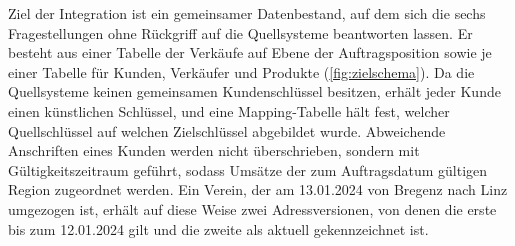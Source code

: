 \documentclass[a4paper,12pt]{article}
\begin{document}
Ziel der Integration ist ein gemeinsamer Datenbestand, auf dem sich die sechs Fragestellungen ohne Rückgriff auf die Quellsysteme beantworten lassen. Er besteht aus einer Tabelle der Verkäufe auf Ebene der Auftragsposition sowie je einer Tabelle für Kunden, Verkäufer und Produkte (\cref{fig:zielschema}). Da die Quellsysteme keinen gemeinsamen Kundenschlüssel besitzen, erhält jeder Kunde einen künstlichen Schlüssel, und eine Mapping-Tabelle hält fest, welcher Quellschlüssel auf welchen Zielschlüssel abgebildet wurde. Abweichende Anschriften eines Kunden werden nicht überschrieben, sondern mit Gültigkeitszeitraum geführt, sodass Umsätze der zum Auftragsdatum gültigen Region zugeordnet werden. Ein Verein, der am 13.01.2024 von Bregenz nach Linz umgezogen ist, erhält auf diese Weise zwei Adressversionen, von denen die erste bis zum 12.01.2024 gilt und die zweite als aktuell gekennzeichnet ist.
\end{document}

